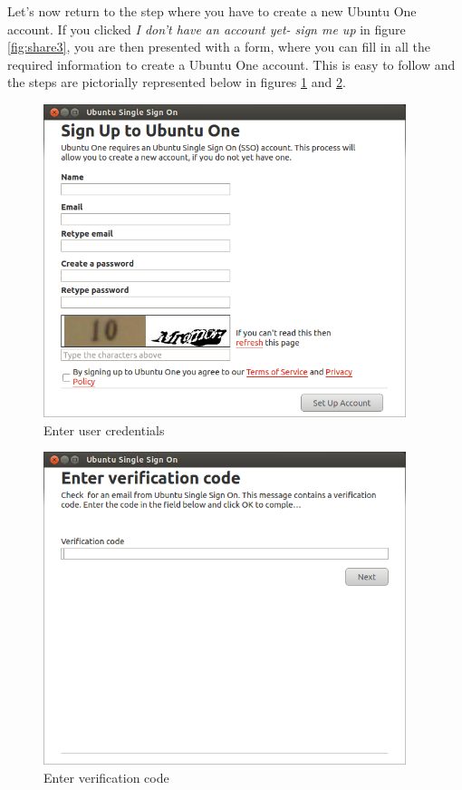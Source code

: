 \newpage
\par \noindent Let's now return to the step where you have to create a new Ubuntu One account. If you clicked \textit{I don't have an account yet- sign me up} in figure \ref{fig:share3}, you are then presented with a form, where you can fill in all the required information to create a Ubuntu One account. This is easy to follow and the steps are pictorially represented below in figures \ref{fig:share5} and \ref{fig:share7}. \\

\begin{figure}[h!]	
	\centering
	\includegraphics[width=300pt]{./images/basic-tasks/share5.png}
	\caption{Enter user credentials}	
	\label{fig:share5}		
\end{figure}

\begin{figure}[h!]	
	\centering
	\includegraphics[width=300pt]{./images/basic-tasks/share7.png}
	\caption{Enter verification code}	
	\label{fig:share7}		
\end{figure}

